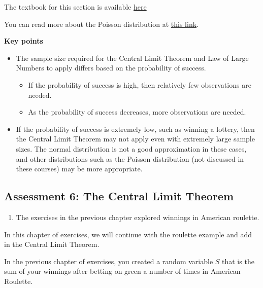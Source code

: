 \documentclass[
]{article}
\providecommand{\tightlist}{%
  \setlength{\itemsep}{0pt}\setlength{\parskip}{0pt}}
\begin{document}
The textbook for this section is available
\href{https://rafalab.github.io/dsbook/random-variables.html\#how-large-is-large-in-the-central-limit-theorem}{here}

You can read more about the Poisson distribution at
\href{https://en.wikipedia.org/wiki/Poisson_distribution}{this link}.

\textbf{Key points}

\begin{itemize}
\tightlist
\item
  The sample size required for the Central Limit Theorem and Law of
  Large Numbers to apply differs based on the probability of success.

  \begin{itemize}
  \tightlist
  \item
    If the probability of success is high, then relatively few
    observations are needed.
  \item
    As the probability of success decreases, more observations are
    needed.
  \end{itemize}
\item
  If the probability of success is extremely low, such as winning a
  lottery, then the Central Limit Theorem may not apply even with
  extremely large sample sizes. The normal distribution is not a good
  approximation in these cases, and other distributions such as the
  Poisson distribution (not discussed in these courses) may be more
  appropriate.
\end{itemize}

\hypertarget{assessment-6-the-central-limit-theorem}{%
\subsection{Assessment 6: The Central Limit
Theorem}\label{assessment-6-the-central-limit-theorem}}

\begin{enumerate}
\def\labelenumi{\arabic{enumi}.}
\tightlist
\item
  The exercises in the previous chapter explored winnings in American
  roulette.
\end{enumerate}

In this chapter of exercises, we will continue with the roulette example
and add in the Central Limit Theorem.

In the previous chapter of exercises, you created a random variable
\(S\) that is the sum of your winnings after betting on green a number
of times in American Roulette.
\end{document}
